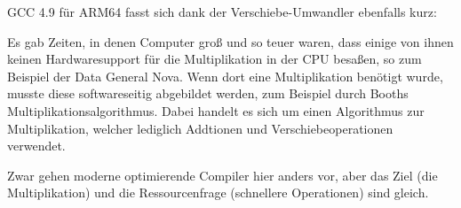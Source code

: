 






GCC 4.9 für ARM64 fasst sich dank der Verschiebe-Umwandler ebenfalls kurz:




Es gab Zeiten, in denen Computer groß und so teuer waren, dass einige von ihnen
keinen Hardwaresupport für die Multiplikation in der \ac{CPU} besaßen, so zum
Beispiel der Data General Nova. 
Wenn dort eine Multiplikation benötigt wurde, musste diese softwareseitig
abgebildet werden, zum Beispiel durch Booths Multiplikationsalgorithmus. 
Dabei handelt es sich um einen Algorithmus zur Multiplikation, welcher lediglich
Addtionen und Verschiebeoperationen verwendet. 

Zwar gehen moderne optimierende Compiler hier anders vor, aber das Ziel (die
Multiplikation) und die Ressourcenfrage (schnellere Operationen) sind gleich.

